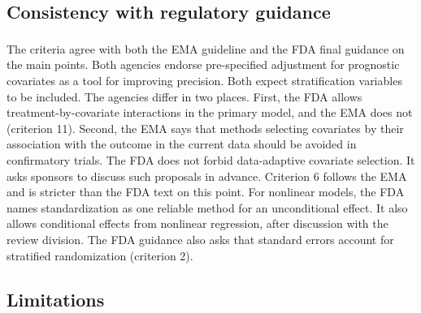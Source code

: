 \documentclass[
  11pt,
]{article}
\begin{document}
\subsection{Consistency with regulatory guidance}\label{consistency-with-regulatory-guidance}

The criteria agree with both the EMA guideline\textsuperscript{} and the FDA final guidance\textsuperscript{} on the main points. Both
agencies endorse pre-specified adjustment for
prognostic covariates as a tool for improving
precision. Both expect stratification variables to be
included. The agencies differ in two places. First, the
FDA allows treatment-by-covariate interactions in the
primary model, and the EMA does not (criterion 11).
Second, the EMA says that methods selecting covariates
by their association with the outcome in the current
data should be avoided in confirmatory trials. The FDA
does not forbid data-adaptive covariate selection. It
asks sponsors to discuss such proposals in advance.
Criterion 6 follows the EMA and is stricter than the
FDA text on this point. For nonlinear models, the FDA names
standardization as one reliable method for an
unconditional effect. It also allows conditional
effects from nonlinear regression, after discussion
with the review division. The FDA guidance also asks
that standard errors account for stratified
randomization (criterion 2).

\subsection{Limitations}\label{limitations}
\end{document}
